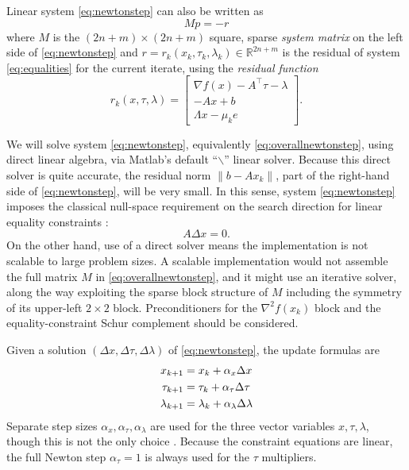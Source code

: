 \documentclass[11pt]{article}
\newcommand{\RR}{\mathbb{R}}
\newcommand{\grad}{\nabla}
\begin{document}
Linear system \eqref{eq:newtonstep} can also be written as
\begin{equation}
M p = - r \label{eq:overallnewtonstep}
\end{equation}
where $M$ is the $(2n+m) \times (2n+m)$ square, sparse \emph{system matrix} on the left side of \eqref{eq:newtonstep} and $r=r_k(x_k,\tau_k,\lambda_k) \in \RR^{2n+m}$ is the residual of system \eqref{eq:equalities} for the current iterate, using the \emph{residual function}
\begin{equation}
r_k(x,\tau,\lambda) = \begin{bmatrix}
\grad f(x) - A^\top \tau - \lambda \\
- A x + b \\
\Lambda x - \mu_k e
\end{bmatrix}. \label{eq:residualnewtonstep}
\end{equation}

We will solve system \eqref{eq:newtonstep}, equivalently \eqref{eq:overallnewtonstep}, using direct linear algebra, via Matlab's default ``$\backslash$'' linear solver.  Because this direct solver is quite accurate, the residual norm $\|b-A x_k\|$, part of the right-hand side of \eqref{eq:newtonstep}, will be very small.  In this sense, system \eqref{eq:newtonstep} imposes the classical null-space requirement on the search direction for linear equality constraints \cite[chapter 3]{GrivaNashSofer2009}:
\begin{equation}
A \Delta x = 0.  \label{eq:dxnull}
\end{equation}
On the other hand, use of a direct solver means the implementation is not scalable to large problem sizes.  A scalable implementation would not assemble the full matrix $M$ in \eqref{eq:overallnewtonstep}, and it might use an iterative solver, along the way exploiting the sparse block structure of $M$ including the symmetry of its upper-left $2\times 2$ block.  Preconditioners \cite{Bueler2021} for the $\grad^2 f(x_k)$ block and the equality-constraint Schur complement \cite[chapters 14]{Bueler2021} should be considered.

Given a solution $(\Delta x,\Delta\tau,\Delta\lambda)$ of \eqref{eq:newtonstep}, the update formulas are
\begin{align}
x_{k+1} &= x_k + \alpha_x \Delta x \label{eq:updates} \\
\tau_{k+1} &= \tau_k + \alpha_\tau \Delta \tau \notag \\
\lambda_{k+1} &= \lambda_k + \alpha_\lambda \Delta \lambda \notag
\end{align}
Separate step sizes $\alpha_x,\alpha_\tau,\alpha_\lambda$ are used for the three vector variables $x,\tau,\lambda$, though this is not the only choice \cite{YamashitaYabe1996}.  Because the constraint equations are linear, the full Newton step $\alpha_\tau=1$ is always used for the $\tau$ multipliers.
\end{document}
